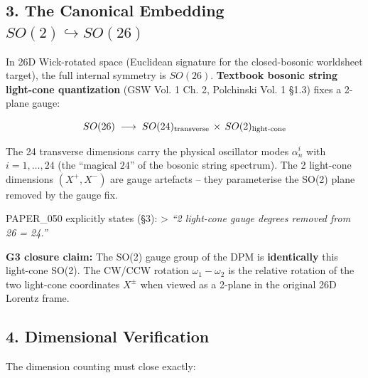 \documentclass[
]{article}
\begin{document}
\subsection{\texorpdfstring{3. The Canonical Embedding
\(SO(2) \hookrightarrow SO(26)\)}{3. The Canonical Embedding SO(2) \textbackslash hookrightarrow SO(26)}}\label{the-canonical-embedding-so2-hookrightarrow-so26}

In 26D Wick-rotated space (Euclidean signature for the closed-bosonic
worldsheet target), the full internal symmetry is \(SO(26)\).
\textbf{Textbook bosonic string light-cone quantization} (GSW Vol. 1 Ch.
2, Polchinski Vol. 1 §1.3) fixes a 2-plane gauge:

\[SO(26) \;\longrightarrow\; SO(24)_{\rm transverse} \,\times\, SO(2)_{\rm light\text{-}cone}\]

The 24 transverse dimensions carry the physical oscillator modes
\(\alpha_n^i\) with \(i=1,\dots,24\) (the ``magical \(24\)'' of the
bosonic string spectrum). The 2 light-cone dimensions \((X^+, X^-)\) are
gauge artefacts -- they parameterise the SO(2) plane removed by the
gauge fix.

PAPER\_050 explicitly states (§3): \textgreater{} \emph{``2 light-cone
gauge degrees removed from 26 = 24.''}

\textbf{G3 closure claim:} The SO(2) gauge group of the DPM is
\textbf{identically} this light-cone SO(2). The CW/CCW rotation
\(\omega_1 - \omega_2\) is the relative rotation of the two light-cone
coordinates \(X^\pm\) when viewed as a 2-plane in the original 26D
Lorentz frame.

\subsection{4. Dimensional Verification}\label{dimensional-verification}

The dimension counting must close exactly:
\end{document}
